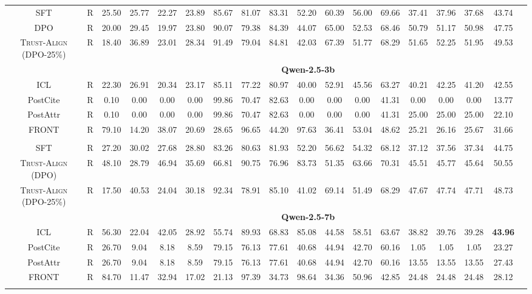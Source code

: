 \documentclass{article} %
\newcommand{\method}[0]{\textsc{Trust-Align}}
\begin{document}
\begin{table}[htb!]
{\begin{tabular}{ccc*{15}c}
SFT & R& 25.50 & 25.77 & 22.27 & 23.89 & 85.67 & 81.07 & 83.31 & 52.20 & 60.39 & 56.00 & 69.66 & 37.41 & 37.96 & 37.68 & 43.74 \\
DPO& R & 20.00 & 29.45 & 19.97 & 23.80 & 90.07 & 79.38 & 84.39 & 44.07 & 65.00 & 52.53 & 68.46 & 50.79 & 51.17 & 50.98 & 47.75 \\
\method{} (DPO-25\%) & R & 18.40 & 36.89 & 23.01 & 28.34 & 91.49 & 79.04 & 84.81 & 42.03 & 67.39 & 51.77 & 68.29 & 51.65 & 52.25 & 51.95 & 49.53 \\

& & \multicolumn{15}{c}{\cellcolor[gray]{0.9}\textbf{Qwen-2.5-3b}} \\
ICL& R & 22.30 & 26.91 & 20.34 & 23.17 & 85.11 & 77.22 & 80.97 & 40.00 & 52.91 & 45.56 & 63.27 & 40.21 & 42.25 & 41.20 & 42.55 \\
PostCite & R & 0.10 & 0.00 & 0.00 & 0.00 & 99.86 & 70.47 & 82.63 & 0.00 & 0.00 & 0.00 & 41.31 & 0.00 & 0.00 & 0.00 & 13.77 \\
PostAttr & R & 0.10 & 0.00 & 0.00 & 0.00 & 99.86 & 70.47 & 82.63 & 0.00 & 0.00 & 0.00 & 41.31 & 25.00 & 25.00 & 25.00 & 22.10 \\
FRONT & R & 79.10 & 14.20 & 38.07 & 20.69 & 28.65 & 96.65 & 44.20 & 97.63 & 36.41 & 53.04 & 48.62 & 25.21 & 26.16 & 25.67 & 31.66 \\\\

SFT& R & 27.20 & 30.02 & 27.68 & 28.80 & 83.26 & 80.63 & 81.93 & 52.20 & 56.62 & 54.32 & 68.12 & 37.12 & 37.56 & 37.34 & 44.75 \\
\method{} (DPO) & R& 48.10 & 28.79 & 46.94 & 35.69 & 66.81 & 90.75 & 76.96 & 83.73 & 51.35 & 63.66 & 70.31 & 45.51 & 45.77 & 45.64 & 50.55 \\
\method{} (DPO-25\%) & R & 17.50 & 40.53 & 24.04 & 30.18 & 92.34 & 78.91 & 85.10 & 41.02 & 69.14 & 51.49 & 68.29 & 47.67 & 47.74 & 47.71 & 48.73 \\

& & \multicolumn{15}{c}{\cellcolor[gray]{0.9}\textbf{Qwen-2.5-7b}} \\

ICL & R& 56.30 & 22.04 & 42.05 & 28.92 & 55.74 & 89.93 & 68.83 & 85.08 & 44.58 & 58.51 & 63.67 & 38.82 & 39.76 & 39.28 & \bf 43.96 \\
PostCite & R & 26.70 & 9.04 & 8.18 & 8.59 & 79.15 & 76.13 & 77.61 & 40.68 & 44.94 & 42.70 & 60.16 & 1.05 & 1.05 & 1.05 & 23.27 \\
PostAttr & R & 26.70 & 9.04 & 8.18 & 8.59 & 79.15 & 76.13 & 77.61 & 40.68 & 44.94 & 42.70 & 60.16 & 13.55 & 13.55 & 13.55 & 27.43 \\
FRONT & R & 84.70 & 11.47 & 32.94 & 17.02 & 21.13 & 97.39 & 34.73 & 98.64 & 34.36 & 50.96 & 42.85 & 24.48 & 24.48 & 24.48 & 28.12 \\\\


\end{tabular}}
\end{table}
\end{document}
